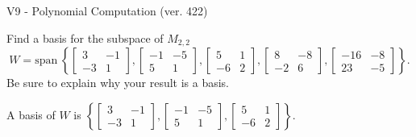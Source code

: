 \begin{exercise}
  \begin{exerciseTitle}V9 - Polynomial Computation (ver. 422)\end{exerciseTitle}
  \begin{exerciseStatement}
    Find a basis for the subspace of \(M_{2,2}\) 
\[W=\mathrm{span}\ \left\{\left[\begin{array}{cc}
3 & -1 \\
-3 & 1
\end{array}\right] , \left[\begin{array}{cc}
-1 & -5 \\
5 & 1
\end{array}\right] , \left[\begin{array}{cc}
5 & 1 \\
-6 & 2
\end{array}\right] , \left[\begin{array}{cc}
8 & -8 \\
-2 & 6
\end{array}\right] , \left[\begin{array}{cc}
-16 & -8 \\
23 & -5
\end{array}\right]\right\}.\]
 Be sure to explain why your result is a basis.


  \end{exerciseStatement}
  \begin{exerciseAnswer}
   A basis of \(W\) is  \(\left\{\left[\begin{array}{cc}
3 & -1 \\
-3 & 1
\end{array}\right] , \left[\begin{array}{cc}
-1 & -5 \\
5 & 1
\end{array}\right] , \left[\begin{array}{cc}
5 & 1 \\
-6 & 2
\end{array}\right]\right\}\).
  


  \end{exerciseAnswer}
\end{exercise}